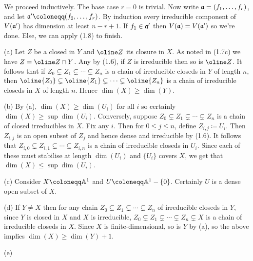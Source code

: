 \begin{nothing}
  We proceed inductively. The base case $r=0$ is trivial. Now write
  $\mathfrak{a} = (f_1,\ldots,f_r)$, and let $\a' \coloneqq
  (f_2,\ldots,f_r)$. By induction every irreducible component of
  $V(\mathfrak{a}')$ has dimension at least $n-r+1$. If $f_1 \in \mathfrak{a}'$ then
  $V(\mathfrak{a}) = V(\mathfrak{a}')$ so we're done. Else, we can apply (1.8) to finish.
\end{nothing}

\begin{nothing}
  (a) Let $Z$ be a closed in $Y$ and $\oline Z$ its closure in $X$. As
  noted in (1.7c) we have $Z = \oline Z \cap Y$. Any by (1.6), if $Z$
  is irreducible then so is $\oline Z$. It follows that if $Z_0
  \subsetneq Z_1 \subsetneq \cdots \subsetneq Z_n$ is a chain of
  irreducible closeds in $Y$ of length $n$, then $\oline{Z_0}
  \subsetneq \oline{Z_1} \subsetneq \cdots \subsetneq \oline{Z_n}$ is
  a chain of irreducible closeds in $X$ of length $n$. Hence $\dim(X)
  \ge \dim(Y)$.

  \medskip\noindent
  (b) By (a), $\dim(X) \ge \dim(U_i)$ for all $i$ so certainly
  $\dim(X) \ge \sup \dim(U_i)$. Conversely, suppose $Z_0 \subsetneq
  Z_1 \subsetneq \cdots \subsetneq Z_n$ is a chain of closed
  irreducibles in $X$. Fix any $i$. Then for $0 \le j \le n$, define
  $Z_{i,j} \coloneqq U_i$. Then $Z_{i,j}$ is an open subset of $Z_j$
  and hence dense and irreducible by (1.6). It follows that $Z_{i,0}
  \subsetneq Z_{i,1} \subsetneq \cdots \subsetneq Z_{i,n}$ is a chain
  of irreducible closeds in $U_i$. Since each of these must stabilise
  at length $\dim(U_i)$ and $\{U_i\}$ covers $X$, we get that $\dim(X)
  \le \sup \dim(U_i)$.

  \medskip\noindent
  (c) Consider $X \coloneqq \A^1$ and $U \coloneqq \A^1 -
  \{0\}$. Certainly $U$ is a dense open subset of $X$.

  \medskip\noindent
  (d) If $Y \ne X$ then for any chain $Z_0 \subsetneq Z_1 \subsetneq
  \cdots \subsetneq Z_n$ of irreducible closeds in $Y$, since $Y$ is
  closed in $X$ and $X$ is irreducible, $Z_0 \subsetneq Z_1 \subsetneq
  \cdots \subsetneq Z_n \subsetneq X$ is a chain of irreducible
  closeds in $X$. Since $X$ is finite-dimensional, so is $Y$ by (a),
  so the above implies $\dim(X) \ge \dim(Y) + 1$.

  \medskip\noindent
  (e) 
\end{nothing}






